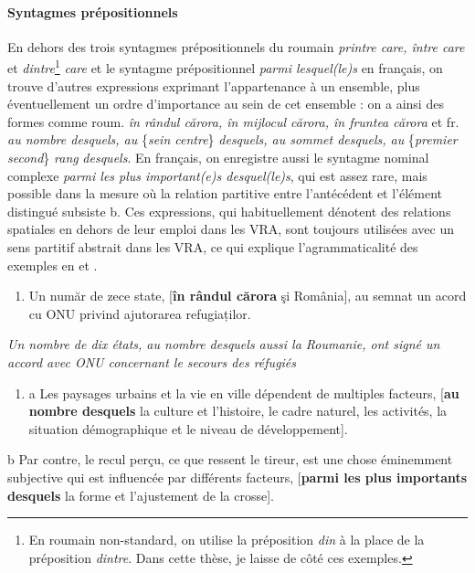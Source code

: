 \paragraph[Syntagmes prépositionnels]{Syntagmes prépositionnels}
En dehors des trois syntagmes prépositionnels du roumain\textit{ printre care, între care} et \textit{dintre}\footnote{En roumain non-standard, on utilise la préposition \textit{din} à la place de la préposition \textit{dintre}. Dans cette thèse, je laisse de côté ces exemples.}\textit{ care} et le syntagme prépositionnel \textit{parmi lesquel(le)s} en français, on trouve d'autres expressions exprimant l'appartenance à un ensemble, plus éventuellement un ordre d'importance au sein de cet ensemble : on a ainsi des formes comme roum. \textit{în rândul cărora, în mijlocul cărora, în fruntea cărora} et fr. \textit{au nombre desquels, au} \{\textit{sein {\textbar} centre}\}\textit{ desquels, au sommet desquels, au} \{\textit{premier {\textbar} second}\} \textit{rang} \textit{desquels}. En français, on enregistre aussi le syntagme nominal complexe\textit{ parmi les plus important(e)s desquel(le)s}, qui est assez rare, mais possible dans la mesure où la relation partitive entre l'antécédent et l'élément distingué subsiste b. Ces expressions, qui habituellement dénotent des relations spatiales en dehors de leur emploi dans les VRA, sont toujours utilisées avec un sens partitif abstrait dans les VRA, ce qui explique l'agrammaticalité des exemples en  et .  


\begin{enumerate}
\item \label{bkm:Ref292836798}Un număr de zece state, [\textbf{în rândul cărora} şi România], au semnat un acord cu ONU privind ajutorarea refugiaților. 


\end{enumerate}
{\itshape
Un nombre de dix états, au nombre desquels aussi la Roumanie, ont signé un accord avec ONU concernant le secours des réfugiés} 


\begin{enumerate}
\item \label{bkm:Ref292835771}a  Les paysages urbains et la vie en ville dépendent de multiples facteurs, [\textbf{au nombre desquels} la culture et l'histoire, le cadre naturel, les activités, la situation démographique et le niveau de développement].


\end{enumerate}
  b  Par contre, le recul perçu, ce que ressent le tireur, est une chose éminemment subjective qui est influencée par différents facteurs, [\textbf{parmi les plus importants desquels} la forme et l'ajustement de la crosse].


